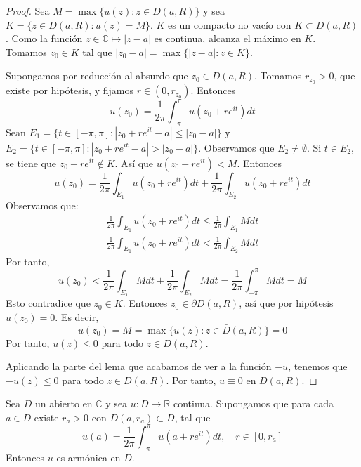 \begin{proof}
    Sea $M = \max\{u(z) : z \in \bar{D}(a, R)\}$ y sea $K = \{z \in \bar{D}(a, R) : u(z) = M\}$.
    $K$ es un compacto no vacío con $K \subset \bar{D}(a, R)$.
    Como la función $z \in \mathbb{C} \mapsto |z-a|$ es continua, alcanza el máximo en $K$.
    Tomamos $z_0 \in K$ tal que $|z_0-a| = \max\{|z-a| : z \in K\}$.

    Supongamos por reducción al absurdo que $z_0 \in D(a, R)$.
    Tomamos $r_{z_0} > 0$, que existe por hipótesis, y fijamos $r \in (0, r_{z_0})$.
    Entonces
    $$u(z_0) = \frac{1}{2\pi} \int_{-\pi}^\pi u(z_0 + re^{it})dt$$
    Sean $E_1 = \{t \in [-\pi, \pi] : |z_0+re^{it}-a| \leq |z_0-a|\}$ y $E_2 = \{t \in [-\pi, \pi] : |z_0+re^{it}-a| > |z_0-a|\}$.
    Observamos que $E_2 \neq \emptyset$.
    Si $t \in E_2$, se tiene que $z_0 + re^{it} \notin K$.
    Así que $u(z_0 + re^{it}) < M$.
    Entonces
    $$u(z_0) = \frac{1}{2\pi} \int_{E_1} u(z_0 + re^{it})dt + \frac{1}{2\pi} \int_{E_2} u(z_0 + re^{it})dt$$
    Observamos que:
    \begin{align*}
        \frac{1}{2\pi} \int_{E_1} u(z_0 + re^{it})dt \leq \frac{1}{2\pi} \int_{E_1} Mdt \\
        \frac{1}{2\pi} \int_{E_1} u(z_0 + re^{it})dt < \frac{1}{2\pi} \int_{E_2} Mdt
    \end{align*}
    Por tanto,
    $$u(z_0) < \frac{1}{2\pi} \int_{E_1} Mdt + \frac{1}{2\pi} \int_{E_2} Mdt = \frac{1}{2\pi} \int_{-\pi}^\pi Mdt = M$$
    Esto contradice que $z_0 \in K$.
    Entonces $z_0 \in \partial D(a, R)$, así que por hipótesis $u(z_0) = 0$.
    Es decir,
    $$u(z_0) = M = \max\{u(z) : z \in \bar{D}(a, R)\} = 0$$
    Por tanto, $u(z) \leq 0$ para todo $z \in D(a, R)$.

    Aplicando la parte del lema que acabamos de ver a la función $-u$, tenemos que $-u(z) \leq 0$ para todo $z \in D(a, R)$.
    Por tanto, $u \equiv 0$ en $D(a, R)$.
\end{proof}

\begin{theorem}
    Sea $D$ un abierto en $\mathbb{C}$ y sea $u: D \to \mathbb{R}$ continua.
    Supongamos que para cada $a \in D$ existe $r_a > 0$ con $D(a, r_a) \subset D$, tal que
    $$u(a) = \frac{1}{2\pi} \int_{-\pi}^\pi u(a + re^{it})dt, \quad r \in [0, r_a]$$
    Entonces $u$ es armónica en $D$.
\end{theorem}

